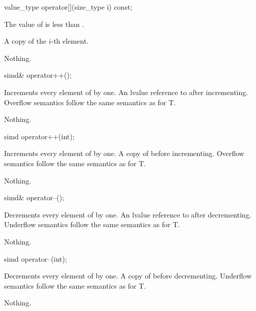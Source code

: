 \begin{itemdecl}
value_type operator[](size_type i) const;
\end{itemdecl}
\begin{itemdescr}
  \pnum\requires The value of  is less than .

  \pnum\returns A copy of the $i$-th element.

  \pnum\throws Nothing.
\end{itemdescr}

\begin{itemdecl}
simd& operator++();
\end{itemdecl}
\begin{itemdescr}
  \pnum\effects Increments every element of  by one.
  \pnum\returns An lvalue reference to  after incrementing.
  \pnum\remarks Overflow semantics follow the same semantics as for \type T.

  \pnum\throws Nothing.
\end{itemdescr}

\begin{itemdecl}
simd operator++(int);
\end{itemdecl}
\begin{itemdescr}
  \pnum\effects Increments every element of  by one.
  \pnum\returns A copy of  before incrementing.
  \pnum\remarks Overflow semantics follow the same semantics as for \type T.

  \pnum\throws Nothing.
\end{itemdescr}

\begin{itemdecl}
simd& operator--();
\end{itemdecl}
\begin{itemdescr}
  \pnum\effects Decrements every element of  by one.
  \pnum\returns An lvalue reference to  after decrementing.
  \pnum\remarks Underflow semantics follow the same semantics as for \type T.

  \pnum\throws Nothing.
\end{itemdescr}

\begin{itemdecl}
simd operator--(int);
\end{itemdecl}
\begin{itemdescr}
  \pnum\effects Decrements every element of  by one.
  \pnum\returns A copy of  before decrementing.
  \pnum\remarks Underflow semantics follow the same semantics as for \type T.

  \pnum\throws Nothing.
\end{itemdescr}

